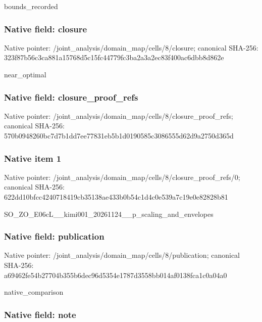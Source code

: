 \documentclass[10pt,a4paper]{article}
\begin{document}
bounds\_recorded


\subsubsection{Native field: closure}


Native pointer: /joint\_analysis/domain\_m\allowbreak{}ap/cells/8/closure; canonical SHA-256: 323f87b56c3ca881a15768d5\allowbreak{}c15fc44779fc3ba2a3a2ec83\allowbreak{}f400ac6dbb8d862e


near\_optimal


\subsubsection{Native field: closure\_proof\_refs}


Native pointer: /joint\_analysis/domain\_m\allowbreak{}ap/cells/8/closure\_proof\allowbreak{}\_refs; canonical SHA-256: 570b0948260bc7d7b1dd7ee7\allowbreak{}7831eb5b1d0190585c308655\allowbreak{}5d62d9a2750d365d



\subsubsection{Native item 1}


Native pointer: /joint\_analysis/domain\_m\allowbreak{}ap/cells/8/closure\_proof\allowbreak{}\_refs/0; canonical SHA-256: 622dd10bfcc4240718419cb3\allowbreak{}5138ae433b0b54c1d4c0e539\allowbreak{}a7c19e0e82828b81


SO\_ZO\_E06cL\_\_kimi001\_202\allowbreak{}61124\_\_p\_scaling\_and\_env\allowbreak{}elopes


\subsubsection{Native field: publication}


Native pointer: /joint\_analysis/domain\_m\allowbreak{}ap/cells/8/publication; canonical SHA-256: a69462fe54b27704b355b6de\allowbreak{}c96d5354e1787d3558bb014a\allowbreak{}f0138fca1c0a04a0


native\_comparison


\subsubsection{Native field: note}
\end{document}
